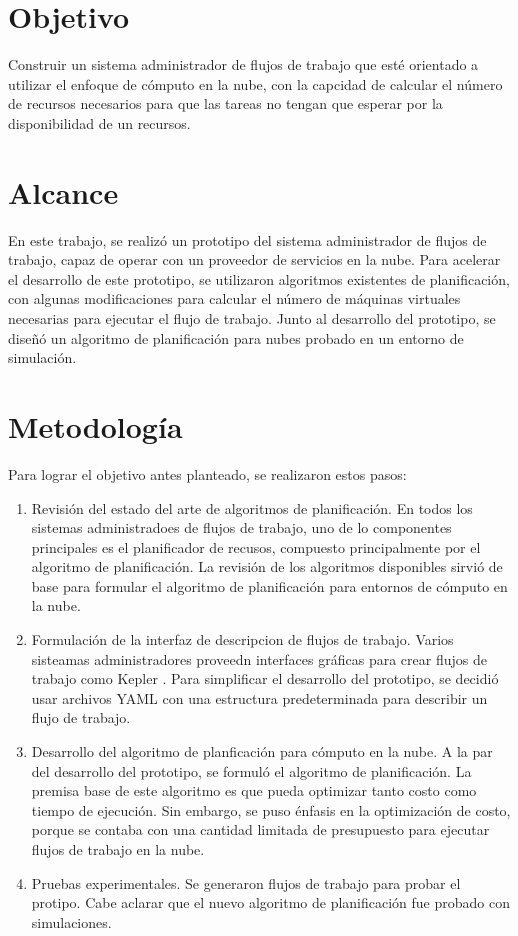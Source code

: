 \section{Objetivo}

Construir un sistema administrador de flujos de trabajo que esté orientado a utilizar el enfoque de cómputo en la nube, con la capcidad de calcular el n\'umero de recursos necesarios para que las tareas no tengan que esperar por la disponibilidad de un recursos.

\section{Alcance}

En este trabajo, se realiz\'o un prototipo del sistema administrador de flujos de trabajo, capaz de operar con un proveedor de servicios en la nube. Para acelerar el desarrollo de este prototipo, se utilizaron algoritmos existentes de planificaci\'on, con algunas modificaciones para calcular el n\'umero de m\'aquinas virtuales necesarias para ejecutar el flujo de trabajo. Junto al desarrollo del prototipo, se dise\~n\'o un algoritmo de planificaci\'on para nubes probado en un entorno de simulaci\'on.


\section{Metodolog\'ia}

Para lograr el objetivo antes planteado, se realizaron estos pasos:

\begin{enumerate}
\item Revisi\'on del estado del arte de algoritmos de planificaci\'on. En todos los sistemas administradoes de flujos de trabajo, uno de lo componentes principales es el planificador de recusos, compuesto principalmente por el algoritmo de planificaci\'on. La revisi\'on de los algoritmos disponibles sirvi\'o de base para formular el algoritmo de planificaci\'on para entornos de c\'omputo en la nube.
\item Formulaci\'on de la interfaz de descripcion de flujos de trabajo. Varios sisteamas administradores proveedn interfaces gr\'aficas para crear flujos de trabajo como Kepler \cite{altintas2016kepler}. Para simplificar el desarrollo del prototipo, se decidi\'o usar archivos YAML con una estructura predeterminada para describir un flujo de trabajo.
\item Desarrollo del algoritmo de planficaci\'on para c\'omputo en la nube. A la par del desarrollo del prototipo, se formul\'o el algoritmo de planificaci\'on. La premisa base de este algoritmo es que pueda optimizar tanto costo como tiempo de ejecuci\'on. Sin embargo, se puso \'enfasis en la optimizaci\'on de costo, porque se contaba con una cantidad limitada de presupuesto para ejecutar flujos de trabajo en la nube. 
\item Pruebas experimentales. Se generaron flujos de trabajo para probar el protipo. Cabe aclarar que el nuevo algoritmo de planificaci\'on fue probado con simulaciones.
\end{enumerate}

